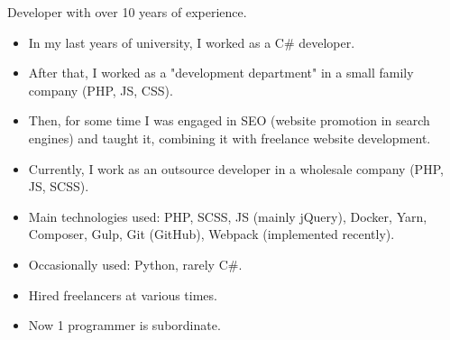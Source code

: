 










\begin{minipage}[t]{0.55\textwidth} %
	\vspace{-\baselineskip} %


	Developer with over 10 years of experience.
  \bigskip
  \small{
    \begin{itemize}[leftmargin=1pt]
      \item In my last years of university, I worked as a C\# developer.
      \item After that, I worked as a "development department" in a small family company (PHP, JS, CSS).
      \item Then, for some time I was engaged in SEO (website promotion in search engines) and taught it, combining it with freelance website development.
      \item Currently, I work as an outsource developer in a wholesale company (PHP, JS, SCSS).
      \item{Main technologies used: PHP, SCSS, JS (mainly jQuery), Docker, Yarn, Composer, Gulp, Git (GitHub), Webpack (implemented recently).}
      \item Occasionally used: Python, rarely C\#.
      \item Hired freelancers at various times.
      \item Now 1 programmer is subordinate.
    \end{itemize}
  }
\end{minipage}
\hfill %
\begin{minipage}[t]{0.35\textwidth} %
	 \vspace{-\baselineskip} %

   
\end{minipage}




